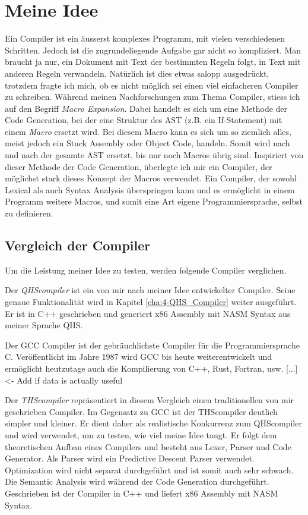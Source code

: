 \chapter{Meine Idee} \label{cha:3-Meine_Idee}
Ein Compiler ist ein äusserst komplexes Programm, mit vielen verschiedenen Schritten. Jedoch ist die zugrundeliegende Aufgabe gar nicht so kompliziert.
Man braucht ja nur, ein Dokument mit Text der bestimmten Regeln folgt, in Text mit anderen Regeln verwandeln. Natürlich ist dies etwas salopp ausgedrückt, trotzdem fragte ich mich,
ob es nicht möglich sei einen viel einfacheren Compiler zu schreiben. Während meinen Nachforschungen zum Thema Compiler, stiess ich auf den Begriff \textit{Macro Expansion}.
Dabei handelt es sich um eine Methode der Code Generation, bei der eine Struktur des AST (z.B. ein If-Statement) mit einem \textit{Macro} ersetzt wird. Bei diesem Macro kann es sich um so ziemlich alles,
meist jedoch ein Stuck Assembly oder Object Code, handeln. Somit wird nach und nach der gesamte AST ersetzt, bis nur noch Macros übrig sind. Inspiriert von dieser Methode der Code Generation,
überlegte ich mir ein Compiler, der möglichst stark dieses Konzept der Macros verwendet. Ein Compiler, der sowohl Lexical als auch Syntax Analysis überspringen kann und es ermöglicht in einem Programm weitere Macros,
und somit eine Art eigene Programmiersprache, selbst zu definieren.

\section{Vergleich der Compiler}
Um die Leistung meiner Idee zu testen, werden folgende Compiler verglichen.

Der \textit{QHScompiler} ist ein von mir nach meiner Idee entwickelter Compiler. Seine genaue Funktionalität wird in Kapitel \ref{cha:4-QHS_Compiler} weiter ausgeführt.
Er ist in C++ geschrieben und generiert x86 Assembly mit NASM Syntax aus meiner Sprache QHS.

Der GCC Compiler ist der gebräuchlichste Compiler für die Programmiersprache C. Veröffentlicht im Jahre 1987 wird GCC bis heute weiterentwickelt und ermöglicht heutzutage auch die Kompilierung von C++, Rust, Fortran, usw.
[...] <- Add if data is actually useful

Der \textit{THScompiler} repräsentiert in diesem Vergleich einen traditionellen von mir geschrieben Compiler. Im Gegensatz zu GCC ist der THScompiler deutlich simpler und kleiner.
Er dient daher als realistische Konkurrenz zum QHScompiler und wird verwendet, um zu testen, wie viel meine Idee taugt. Er folgt dem theoretischen Aufbau eines Compilers und besteht aus Lexer, Parser und Code Generator.
Als Parser wird ein Predictive Descent Parser verwendet. Optimization wird nicht separat durchgeführt und ist somit auch sehr schwach.
Die Semantic Analysis wird während der Code Generation durchgeführt. Geschrieben ist der Compiler in C++ und liefert x86 Assembly mit NASM Syntax.



